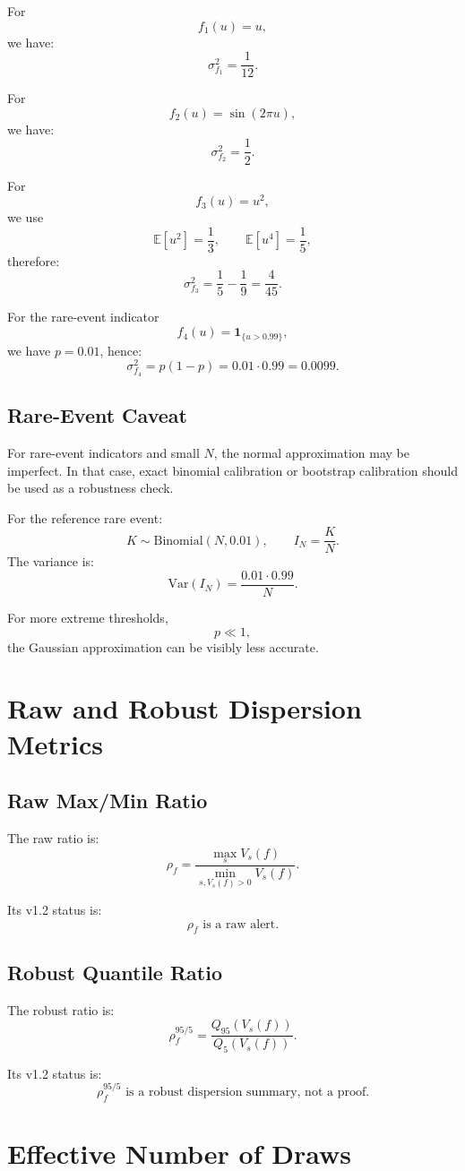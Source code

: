 \documentclass[11pt,a4paper]{article}
\newcommand{\E}{\mathbb E}
\newcommand{\Var}{\mathrm{Var}}
\newcommand{\Bin}{\mathrm{Binomial}}
\begin{document}
For
\[
f_1(u)=u,
\]
we have:
\[
\sigma_{f_1}^2=\frac1{12}.
\]

For
\[
f_2(u)=\sin(2\pi u),
\]
we have:
\[
\sigma_{f_2}^2=\frac12.
\]

For
\[
f_3(u)=u^2,
\]
we use
\[
\E[u^2]=\frac13,
\qquad
\E[u^4]=\frac15,
\]
therefore:
\[
\sigma_{f_3}^2
=
\frac15-\frac19
=
\frac4{45}.
\]

For the rare-event indicator
\[
f_4(u)=\mathbf 1_{\{u>0.99\}},
\]
we have \(p=0.01\), hence:
\[
\sigma_{f_4}^2=p(1-p)=0.01\cdot0.99=0.0099.
\]

\subsection{Rare-Event Caveat}

For rare-event indicators and small \(N\), the normal approximation may be imperfect. In that case, exact binomial calibration or bootstrap calibration should be used as a robustness check.

For the reference rare event:
\[
K\sim\Bin(N,0.01),
\qquad
I_N=\frac KN.
\]
The variance is:
\[
\Var(I_N)=\frac{0.01\cdot0.99}{N}.
\]

For more extreme thresholds,
\[
p\ll1,
\]
the Gaussian approximation can be visibly less accurate.

\section{Raw and Robust Dispersion Metrics}

\subsection{Raw Max/Min Ratio}

The raw ratio is:
\[
\rho_f
=
\frac{\max_s V_s(f)}
{\min_{s,V_s(f)>0}V_s(f)}.
\]

Its v1.2 status is:
\[
\boxed{
\rho_f\text{ is a raw alert.}
}
\]

\subsection{Robust Quantile Ratio}

The robust ratio is:
\[
\rho_f^{95/5}
=
\frac{Q_{95}(V_s(f))}
{Q_5(V_s(f))}.
\]

Its v1.2 status is:
\[
\boxed{
\rho_f^{95/5}\text{ is a robust dispersion summary, not a proof.}
}
\]

\section{Effective Number of Draws}
\end{document}
